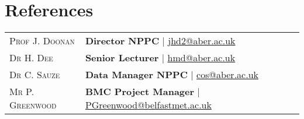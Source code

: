 \documentclass[a4paper,9pt]{article}
\begin{document}
\section{References}
\begin{tabular}{ll}	
  \textsc{Prof J. Doonan} & \textbf{Director NPPC} | \href{jhd2@aber.ac.uk}{jhd2@aber.ac.uk}
  \\
  \textsc{Dr H. Dee} & \textbf{Senior Lecturer} | \href{hmd@aber.ac.uk}{hmd@aber.ac.uk}
  \\
  \textsc{Dr C. Sauze} & \textbf{Data Manager NPPC} | \href{cos@aber.ac.uk}{cos@aber.ac.uk}
\\
  \textsc{Mr P. Greenwood} & \textbf{BMC Project Manager} | \href{PGreenwood@belfastmet.ac.uk}{PGreenwood@belfastmet.ac.uk}
  \\
\end{tabular}
\end{document}
